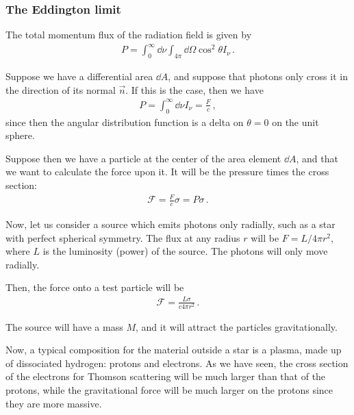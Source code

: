 \documentclass[main.tex]{subfiles}
\begin{document}
\subsubsection{The Eddington limit}

The total momentum flux of the radiation field is given by 
%
\begin{align}
P = \int_{0}^{\infty } \dd{\nu } \int_{4 \pi } \dd{\Omega } \cos^2 \theta I_\nu 
\,.
\end{align}

Suppose we have a differential area \(\dd{A}\), and suppose that photons only cross it in the direction of its normal \(\vec{n}\). 
If this is the case, then we have 
%
\begin{align}
P = \int_0^{\infty } \dd{\nu } I_\nu  = \frac{F}{c}
\,,
\end{align}
%
since then the angular distribution function is a delta on \(\theta = 0 \) on the unit sphere. 

Suppose then we have a particle at the center of the area element \(\dd{A}\), and that we want to calculate the force upon it. It will be the pressure times the cross section: 
%
\begin{align}
\mathscr{F} = \frac{F}{c} \sigma = P \sigma 
\,.
\end{align}

Now, let us consider a source which emits photons only radially, such as a star with perfect spherical symmetry. 
The flux at any radius \(r\) will be \(F = L / 4 \pi r^2\), where \(L\) is the luminosity (power) of the source. 
The photons will only move radially. 

Then, the force onto a test particle will be 
%
\begin{align}
\mathscr{F} = \frac{L \sigma }{c 4 \pi r^2}
\,.
\end{align}

The source will have a mass \(M\), and it will attract the particles gravitationally.

Now, a typical composition for the material outside a star is a plasma, made up of dissociated hydrogen: protons and electrons.
As we have seen, the cross section of the electrons for Thomson scattering will be much larger than that of the protons, while the gravitational force will be much larger on the protons since they are more massive. 
\end{document}
